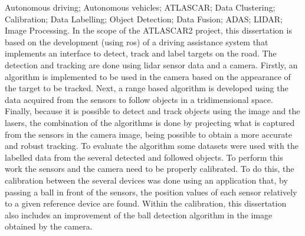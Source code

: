 \documentclass[11pt,twoside,a4paper,openright]{report}
\begin{document}
\TitlePage
  \vspace*{55mm}
  {Autonomous driving; Autonomous vehicles; ATLASCAR; Data Clustering; Calibration; Data Labelling; Object Detection; Data Fusion; ADAS; LIDAR; Image Processing.}
  \vspace*{5mm}
       {In the scope of the ATLASCAR2 project, this dissertation is based on the development (using \gls{ros}) of a driving assistance system that implements an interface to detect, track and label targets on the road. The detection and tracking are done using \gls{lidar} sensor data and a camera. Firstly, an algorithm is implemented to be used in the camera based on the appearance of the target to be tracked. Next, a range based algorithm is developed using the data acquired from the sensors to follow objects in a tridimensional space. Finally, because it is possible to detect and track objects using the image and the lasers, the combination of the algorithms is done by projecting what is captured from the sensors in the camera image, being possible to obtain a more accurate and robust tracking. To evaluate the algorithm some datasets were used with the labelled data from the several detected and followed objects. To perform this work the sensors and the camera need to be properly calibrated. To do this, the calibration between the several devices was done using an application that, by passing a ball in front of the sensors, the position values of each sensor relatively to a given reference device are found. Within the calibration, this dissertation also includes an improvement of the ball detection algorithm in the image obtained by the camera.}
\EndTitlePage
\titlepage\ \endtitlepage %


%
%

\tableofcontents

\cleardoublepage
\listoffigures

\cleardoublepage
\listoftables

\cleardoublepage
\lstlistoflistings


\cleardoublepage




\titlepage\ \endtitlepage      %
\end{document}
